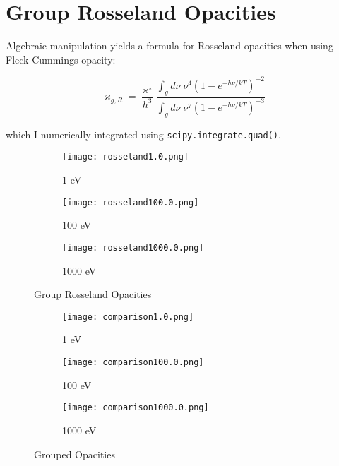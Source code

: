 \documentclass{template}
\begin{document}
\clearpage
\section{Group Rosseland Opacities}

Algebraic manipulation yields a formula for Rosseland opacities when using Fleck-Cummings opacity:

\begin{equation}
  \varkappa_{g,R} =  \frac{\varkappa^\star}{h^3}   \frac{ \int_g d\nu \;   \nu^4 {\left(  1 - e^{-h\nu/kT}  \right)}^{-2}   }{     \int_g d\nu \;   \nu^7 {\left(  1 - e^{-h\nu/kT}  \right)}^{-3}  }
\end{equation}

which I numerically integrated using \verb|scipy.integrate.quad()|.

\begin{figure}[h]
  \centering
  
  \begin{subfigure}{0.48\textwidth}
        \texttt{[image: rosseland1.0.png]}
        \caption{1 eV}
  \end{subfigure}
  \begin{subfigure}{0.48\textwidth}
        \texttt{[image: rosseland100.0.png]}
        \caption{100 eV}
  \end{subfigure}

  \begin{subfigure}{0.48\textwidth}
        \texttt{[image: rosseland1000.0.png]}
        \caption{1000 eV}
  \end{subfigure}
  \caption{Group Rosseland Opacities}
\end{figure}

\begin{figure}[h]
  \centering

  \begin{subfigure}{0.48\textwidth}
        \texttt{[image: comparison1.0.png]}
        \caption{1 eV}
  \end{subfigure}
  \begin{subfigure}{0.48\textwidth}
        \texttt{[image: comparison100.0.png]}
        \caption{100 eV}
  \end{subfigure}

  \begin{subfigure}{0.48\textwidth}
        \texttt{[image: comparison1000.0.png]}
        \caption{1000 eV}
  \end{subfigure}
  \caption{Grouped Opacities}
\end{figure}
\end{document}
